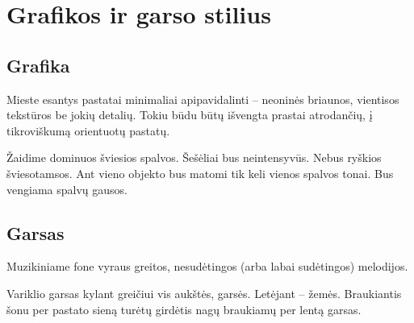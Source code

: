 \section{Grafikos ir garso stilius}
\subsection{Grafika}

Mieste esantys pastatai minimaliai apipavidalinti -- neoninės briaunos, vientisos tekstūros be jokių detalių.
Tokiu būdu būtų išvengta prastai atrodančių, į tikroviškumą orientuotų pastatų.

Žaidime dominuos šviesios spalvos.
Šešėliai bus neintensyvūs.
Nebus ryškios šviesotamsos.
Ant vieno objekto bus matomi tik keli vienos spalvos tonai.
Bus vengiama spalvų gausos.

\subsection{Garsas}

Muzikiniame fone vyraus greitos, nesudėtingos (arba labai sudėtingos) melodijos.

Variklio garsas kylant greičiui vis aukštės, garsės. Letėjant -- žemės.
Braukiantis šonu per pastato sieną turėtų girdėtis nagų braukiamų per lentą garsas.
